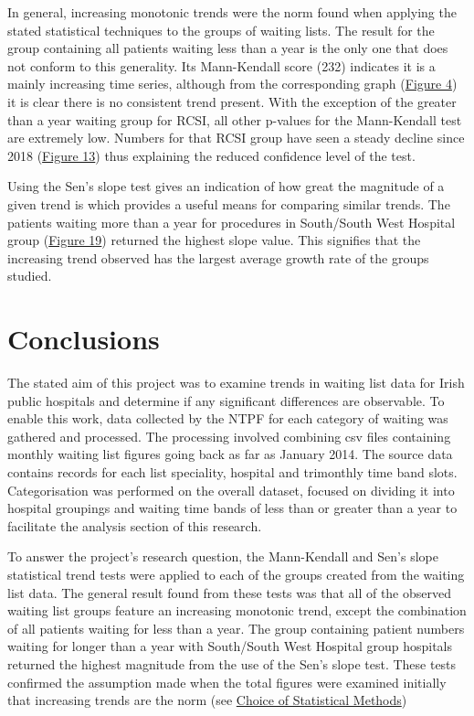 \documentclass[
  12pt,
]{article}
\begin{document}
\newpage

In general, increasing monotonic trends were the norm found when applying the stated statistical techniques to the groups of waiting lists. The result for the group containing all patients waiting less than a year is the only one that does not conform to this generality. Its Mann-Kendall score (232) indicates it is a mainly increasing time series, although from the corresponding graph (\hyperref[fig:ts-overall-lt1yr]{Figure 4}) it is clear there is no consistent trend present. With the exception of the greater than a year waiting group for RCSI, all other p-values for the Mann-Kendall test are extremely low. Numbers for that RCSI group have seen a steady decline since 2018 (\hyperref[fig:ts-rcsi-gt1yr]{Figure 13}) thus explaining the reduced confidence level of the test.

Using the Sen's slope test gives an indication of how great the magnitude of a given trend is which provides a useful means for comparing similar trends. The patients waiting more than a year for procedures in South/South West Hospital group (\hyperref[fig:ts-ssw-gt1yr]{Figure 19}) returned the highest slope value. This signifies that the increasing trend observed has the largest average growth rate of the groups studied.

\hypertarget{conclusions}{%
\section{Conclusions}\label{conclusions}}

The stated aim of this project was to examine trends in waiting list data for Irish public hospitals and determine if any significant differences are observable. To enable this work, data collected by the NTPF for each category of waiting was gathered and processed. The processing involved combining csv files containing monthly waiting list figures going back as far as January 2014. The source data contains records for each list speciality, hospital and trimonthly time band slots. Categorisation was performed on the overall dataset, focused on dividing it into hospital groupings and waiting time bands of less than or greater than a year to facilitate the analysis section of this research.

To answer the project's research question, the Mann-Kendall and Sen's slope statistical trend tests were applied to each of the groups created from the waiting list data. The general result found from these tests was that all of the observed waiting list groups feature an increasing monotonic trend, except the combination of all patients waiting for less than a year. The group containing patient numbers waiting for longer than a year with South/South West Hospital group hospitals returned the highest magnitude from the use of the Sen's slope test. These tests confirmed the assumption made when the total figures were examined initially that increasing trends are the norm (see \hyperref[sec:stats-methods]{Choice of Statistical Methods})
\end{document}
